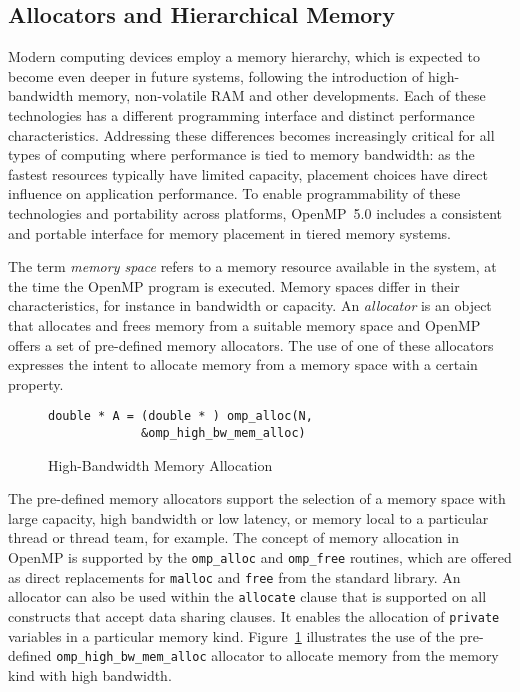 \subsection{Allocators and Hierarchical Memory}
\label{sub:allocators_and_hierarchical_memory}


Modern computing devices employ a memory hierarchy, which is expected to become
even deeper in future systems, following the introduction of high-bandwidth
memory, non-volatile RAM and other developments.
Each of these technologies has a different programming interface and distinct
performance characteristics.
Addressing these differences becomes increasingly critical for all types of
computing where performance is tied to memory bandwidth: as the fastest
resources typically have limited capacity, placement choices have direct
influence on application performance.
To enable programmability of these technologies and portability across
platforms, OpenMP~5.0 includes a consistent and portable interface for memory
placement in tiered memory systems.


The term \emph{memory space} refers to a memory resource available in the
system, at the time the OpenMP program is executed.
Memory spaces differ in their characteristics, for instance in bandwidth or
capacity.
An \emph{allocator} is an object that allocates and frees memory from a suitable
memory space and OpenMP offers a set of pre-defined memory allocators.
The use of one of these allocators expresses the intent to allocate memory from
a memory space with a certain property.

\begin{figure}
\begin{verbatim}
double * A = (double * ) omp_alloc(N,
             &omp_high_bw_mem_alloc)
\end{verbatim}
\caption{High-Bandwidth Memory Allocation\label{fig:allocators}}
\end{figure}

The pre-defined memory allocators support the selection of a memory space with
large capacity, high bandwidth or low latency, or memory local to a particular
thread or thread team, for example.
The concept of memory allocation in OpenMP is supported by the
\texttt{omp\_alloc} and \texttt{omp\_free} routines, which are offered as direct
replacements for \texttt{malloc} and \texttt{free} from the standard library.
An allocator can also be used within the \texttt{allocate} clause that is
supported on all constructs that accept data sharing clauses.
It enables the allocation of \texttt{private} variables in a particular memory
kind.
Figure~\ref{fig:allocators} illustrates the use of the pre-defined
\texttt{omp\_high\_bw\_mem\_alloc} allocator to allocate memory from the memory
kind with high bandwidth.

